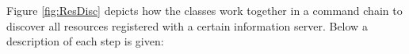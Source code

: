 \documentclass{book}
\begin{document}
Figure \ref{fig:ResDisc} depicts how the classes work together in a command chain to discover all resources registered with 
a certain information server. Below a description of each step is given:

\begin{figure}[ht]
\end{figure}
\end{document}
